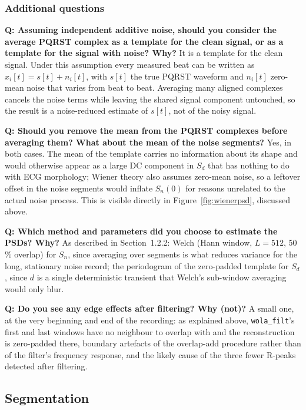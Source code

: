 \documentclass[11pt,a4paper]{article}
\newcommand{\percent}{\%}
\newcommand{\num}[1]{#1}
\newcommand{\SI}[2]{#1\,#2}
\begin{document}
\subsubsection{Additional questions}


\textbf{Q: Assuming independent additive noise, should you consider the average PQRST complex
as a template for the clean signal, or as a template for the signal with noise? Why?} It is a
template for the clean signal.
Under this assumption every measured beat can be written as $x_i[t] = s[t] + n_i[t]$, with
$s[t]$ the true PQRST waveform and $n_i[t]$ zero-mean noise that varies from beat to beat.
Averaging many aligned complexes cancels the noise terms while leaving the shared signal
component untouched, so the result is a noise-reduced estimate of $s[t]$, not of the noisy
signal.

\textbf{Q: Should you remove the mean from the PQRST complexes before averaging them? What
about the mean of the noise segments?} Yes, in both cases. The mean of the template carries no information about its
shape and would otherwise appear as a large DC component in $S_d$ that has nothing to do with
ECG morphology; Wiener theory also assumes zero-mean noise, so a leftover offset in the noise
segments would inflate $S_n(0)$ for reasons unrelated to the actual noise process. This is
visible directly in Figure~\ref{fig:wienerpsd}, discussed above.

\textbf{Q: Which method and parameters did you choose to estimate the PSDs? Why?} As described
in Section~1.2.2: Welch (Hann window, $L=\num{512}$, \SI{50}{\percent} overlap) for $S_n$, since
averaging over segments is what reduces variance for the long, stationary noise record; the
periodogram of the zero-padded template for $S_d$, since $d$ is a single deterministic transient
that Welch's sub-window averaging would only blur.

\textbf{Q: Do you see any edge effects after filtering? Why (not)?} A small one, at the very
beginning and end of the recording: as explained above, \texttt{wola\_filt}'s first and last
windows have no neighbour to overlap with and the reconstruction is zero-padded there, boundary
artefacts of the overlap-add procedure rather than of the filter's frequency response, and the
likely cause of the three fewer R-peaks detected after filtering.

\subsection{Segmentation}
\end{document}
